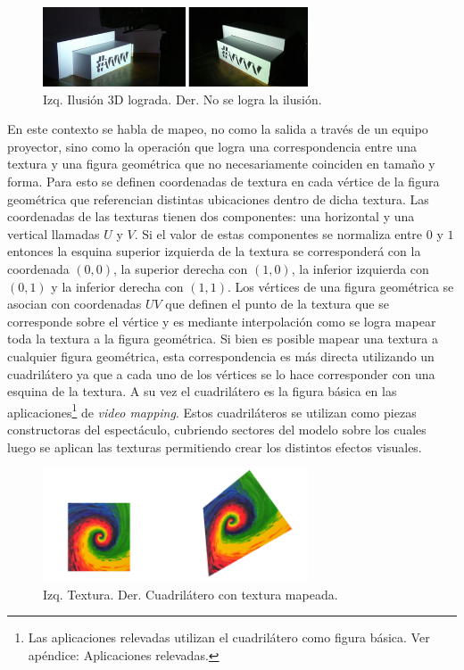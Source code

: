 \begin{figure}[H]
  \centering
    \includegraphics[width=0.7\textwidth]{./Cap2_videomapping/3dillusion}
  \caption[vvvv.org]{Izq. Ilusión 3D lograda. Der. No se logra la ilusión.}
  \label{fig:3dillusion}
\end{figure}

En este contexto se habla de mapeo, no como la salida a través de un equipo proyector, sino como la operación que logra una correspondencia entre una textura y una figura geométrica que no necesariamente coinciden en tamaño y forma. Para esto se definen coordenadas de textura en cada vértice de la figura geométrica que referencian distintas ubicaciones dentro de dicha textura.
Las coordenadas de las texturas tienen dos componentes: una horizontal y una vertical llamadas $U$ y $V$. Si el valor de estas componentes se normaliza entre $0$ y $1$ entonces la esquina superior izquierda de la textura se corresponderá con la coordenada $(0,0)$, la superior derecha con $(1,0)$, la inferior izquierda con $(0,1)$ y la inferior derecha con $(1,1)$.
Los vértices de una figura geométrica se asocian con coordenadas $UV$ que definen el punto de la textura que se corresponde sobre el vértice y es mediante interpolación como se logra mapear toda la textura a la figura geométrica.
Si bien es posible mapear una textura a cualquier figura geométrica, esta correspondencia es más directa utilizando un cuadrilátero ya que a cada uno de los vértices se lo hace corresponder con una esquina de la textura. A su vez el cuadrilátero es la figura básica en las aplicaciones\footnote{Las aplicaciones relevadas utilizan el cuadrilátero como figura básica. Ver apéndice: Aplicaciones relevadas.} de \emph{video mapping}.
Estos cuadriláteros se utilizan como piezas constructoras del espectáculo, cubriendo sectores del modelo sobre los cuales luego se aplican las texturas permitiendo crear los distintos efectos visuales.

\begin{figure}[H]
  \centering
    \includegraphics[width=0.7\textwidth]{./Cap2_videomapping/2dmapping}
  \caption[Imagen propia.]{Izq. Textura. Der. Cuadrilátero con textura mapeada.}
  \label{fig:2dmapping}
\end{figure}

